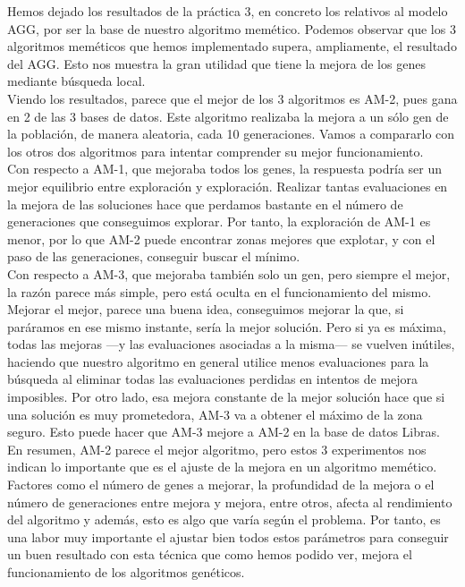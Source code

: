 Hemos dejado los resultados de la práctica 3, en concreto los relativos al modelo AGG, por ser la base de nuestro algoritmo memético. Podemos observar que los 3 algoritmos meméticos que hemos implementado supera, ampliamente, el resultado del AGG. Esto nos muestra la gran utilidad que tiene la mejora de los genes mediante búsqueda local.\\

Viendo los resultados, parece que el mejor de los 3 algoritmos es AM-2, pues gana en 2 de las 3 bases de datos. Este algoritmo realizaba la mejora a un sólo gen de la población, de manera aleatoria, cada 10 generaciones. Vamos a compararlo con los otros dos algoritmos para intentar comprender su mejor funcionamiento.\\

Con respecto a AM-1, que mejoraba todos los genes, la respuesta podría ser un mejor equilibrio entre exploración y exploración. Realizar tantas evaluaciones en la mejora de las soluciones hace que perdamos bastante en el número de generaciones que conseguimos explorar. Por tanto, la exploración de AM-1 es menor, por lo que AM-2 puede encontrar zonas mejores que explotar, y con el paso de las generaciones, conseguir buscar el mínimo.\\

Con respecto a AM-3, que mejoraba también solo un gen, pero siempre el mejor, la razón parece más simple, pero está oculta en el funcionamiento del mismo. Mejorar el mejor, parece una buena idea, conseguimos mejorar la que, si paráramos en ese mismo instante, sería la mejor solución. Pero si ya es máxima, todas las mejoras ---y las evaluaciones asociadas a la misma--- se vuelven inútiles, haciendo que nuestro algoritmo en general utilice menos evaluaciones para la búsqueda al eliminar todas las evaluaciones perdidas en intentos de mejora imposibles. Por otro lado, esa mejora constante de la mejor solución hace que si una solución es muy prometedora, AM-3 va a obtener el máximo de la zona seguro. Esto puede hacer que AM-3 mejore a AM-2 en la base de datos Libras.\\

En resumen, AM-2 parece el mejor algoritmo, pero estos 3 experimentos nos indican lo importante que es el ajuste de la mejora en un algoritmo memético. Factores como el número de genes a mejorar, la profundidad de la mejora o el número de generaciones entre mejora y mejora, entre otros, afecta al rendimiento del algoritmo y además, esto es algo que varía según el problema. Por tanto, es una labor muy importante el ajustar bien todos estos parámetros para conseguir un buen resultado con esta técnica que como hemos podido ver, mejora el funcionamiento de los algoritmos genéticos.\\

